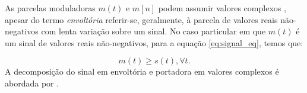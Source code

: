 As parcelas moduladoras $m(t)$ e $m[n]$ podem assumir valores complexos
 \cite{schimmel2007}, apesar do termo \textit{envoltória} referir-se,
 geralmente, à parcela de valores reais não-negativos \cite{haykin2008} com
 lenta variação sobre um sinal. No caso particular em que $m(t)$ é um sinal de
 valores reais não-negativos, para a equação \eqref{eq:signal_eq}, temos que:

\begin{equation}
    m(t) \geq s(t), \forall t.
\end{equation}
A decomposição do sinal em envoltória e portadora em valores complexos é
abordada por \citet{atlas2004}.